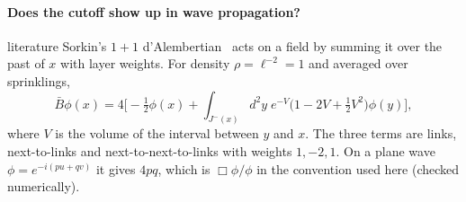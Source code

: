 \documentclass[11pt,a4paper]{article}
\newcommand{\tagbox}[2]{\textsf{\scriptsize\colorbox{#1!12}{\textcolor{#1!70!black}{#2}}}}
\newcommand{\lit}{\tagbox{blue}{literature}}
\begin{document}
\paragraph{Does the cutoff show up in wave propagation?} \lit{} Sorkin's $1+1$ d'Alembertian~\cite{Sorkin07} acts on a field by summing it over the past of $x$ with layer weights. For density $\rho=\ell^{-2}=1$ and averaged over sprinklings,
\begin{equation}
\bar B\phi(x)=4\Big[-\tfrac12\phi(x)+\int_{J^-(x)}\!d^2y\;e^{-V}\big(1-2V+\tfrac12V^2\big)\phi(y)\Big],
\label{eq:box}
\end{equation}
where $V$ is the volume of the interval between $y$ and $x$. The three terms are links, next-to-links and next-to-next-to-links with weights $1,-2,1$. On a plane wave $\phi=e^{-i(pu+qv)}$ it gives $4pq$, which is $\Box\phi/\phi$ in the convention used here (checked numerically).
\end{document}

